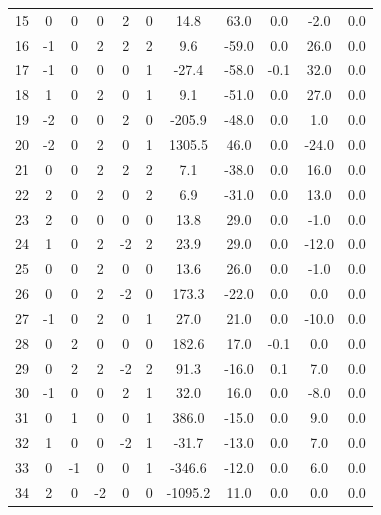 \documentclass [12pt, a4paper] {article}
\begin{document}
\begin {center}
\begin {longtable}{| c | c c c c c | c | c | c | c | r |}
      15 & 0&   0&   0&   2&   0&      14.8&      63.0&       0.0&      -2.0&       0.0 \\
      16 & -1&   0&   2&   2&   2&       9.6&     -59.0&       0.0&      26.0&       0.0 \\
      17 & -1&   0&   0&   0&   1&     -27.4&     -58.0&      -0.1&      32.0&       0.0 \\
      18 & 1&   0&   2&   0&   1&       9.1&     -51.0&       0.0&      27.0&       0.0 \\
      19 & -2&   0&   0&   2&   0&    -205.9&     -48.0&       0.0&       1.0&       0.0 \\
      20 & -2&   0&   2&   0&   1&    1305.5&      46.0&       0.0&     -24.0&       0.0 \\
      21 & 0&   0&   2&   2&   2&       7.1&     -38.0&       0.0&      16.0&       0.0 \\
      22 & 2&   0&   2&   0&   2&       6.9&     -31.0&       0.0&      13.0&       0.0 \\
      23 & 2&   0&   0&   0&   0&      13.8&      29.0&       0.0&      -1.0&       0.0 \\
      24 & 1&   0&   2&  -2&   2&      23.9&      29.0&       0.0&     -12.0&       0.0 \\
      25 & 0&   0&   2&   0&   0&      13.6&      26.0&       0.0&      -1.0&       0.0 \\
      26 & 0&   0&   2&  -2&   0&     173.3&     -22.0&       0.0&       0.0&       0.0 \\
      27 & -1&   0&   2&   0&   1&      27.0&      21.0&       0.0&     -10.0&       0.0 \\
      28 & 0&   2&   0&   0&   0&     182.6&      17.0&      -0.1&       0.0&       0.0 \\
      29 & 0&   2&   2&  -2&   2&      91.3&     -16.0&       0.1&       7.0&       0.0 \\
      30 & -1&   0&   0&   2&   1&      32.0&      16.0&       0.0&      -8.0&       0.0 \\
      31 & 0&   1&   0&   0&   1&     386.0&     -15.0&       0.0&       9.0&       0.0 \\
      32 & 1&   0&   0&  -2&   1&     -31.7&     -13.0&       0.0&       7.0&       0.0 \\
      33 & 0&  -1&   0&   0&   1&    -346.6&     -12.0&       0.0&       6.0&       0.0 \\
      34 & 2&   0&  -2&   0&   0&   -1095.2&      11.0&       0.0&       0.0&       0.0 \\

\end{longtable}
\end{center}
\end{document}
